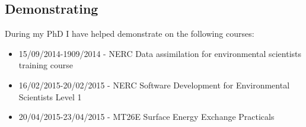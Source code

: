 \documentclass[11pt]{article}
\begin{document}
\subsection{Demonstrating}
During my PhD I have helped demonstrate on the following courses:
\begin{itemize}
\item 15/09/2014-1909/2014 - NERC Data assimilation for environmental scientists training course

\item 16/02/2015-20/02/2015 - NERC Software Development for Environmental Scientists Level 1

\item 20/04/2015-23/04/2015 - MT26E Surface Energy Exchange Practicals
\end{itemize}


{}
%
\end{document}

